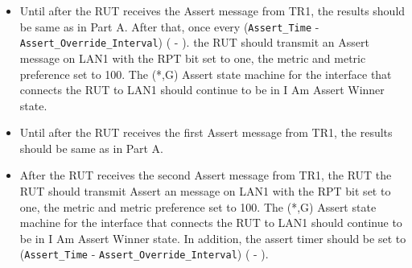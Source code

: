 \documentclass[11pt]{report}
\begin{document}

\begin{itemize}

  \item Until after the RUT receives the Assert message from TR1, the results
  should be same as in Part A. After that, once every \newline
  (\verb=Assert_Time= - \verb=Assert_Override_Interval=)
  ({\PimsmAssertTime} - {\PimsmAssertOverrideInterval}).
  the RUT should transmit an Assert message on LAN1 with the RPT bit set to
  one, the metric and metric preference set to 100. The (*,G) Assert state
  machine for the interface that connects the RUT to LAN1 should continue to
  be in I Am Assert Winner state.

\end{itemize}


\begin{itemize}

  \item Until after the RUT receives the first Assert message from TR1, the
  results should be same as in Part A.

  \item After the RUT receives the second Assert message from TR1, the RUT
  the RUT should transmit Assert an message on LAN1 with the RPT bit set to
  one, the metric and metric preference set to 100. The (*,G) Assert state
  machine for the interface that connects the RUT to LAN1 should continue to
  be in I Am Assert Winner state. In addition, the assert timer should be set
  to \newline
  (\verb=Assert_Time= - \verb=Assert_Override_Interval=)
  ({\PimsmAssertTime} - {\PimsmAssertOverrideInterval}).

\end{itemize}

\end{document}
